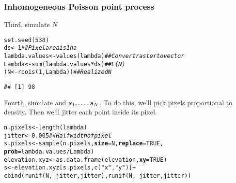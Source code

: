 \documentclass[color=usenames,dvipsnames]{beamer}\usepackage[]{graphicx}\usepackage[]{color}
\makeatletter
\newcommand{\hlnum}[1]{\textcolor[rgb]{0.69,0.494,0}{#1}}%
\newcommand{\hlstr}[1]{\textcolor[rgb]{0.749,0.012,0.012}{#1}}%
\newcommand{\hlcom}[1]{\textcolor[rgb]{0.514,0.506,0.514}{\textit{#1}}}%
\newcommand{\hlopt}[1]{\textcolor[rgb]{0,0,0}{#1}}%
\newcommand{\hlstd}[1]{\textcolor[rgb]{0,0,0}{#1}}%
\newcommand{\hlkwb}[1]{\textcolor[rgb]{0,0.341,0.682}{#1}}%
\newcommand{\hlkwc}[1]{\textcolor[rgb]{0,0,0}{\textbf{#1}}}%
\newcommand{\hlkwd}[1]{\textcolor[rgb]{0.004,0.004,0.506}{#1}}%
\newenvironment{kframe}{%
 \def\at@end@of@kframe{}%
 \ifinner\ifhmode%
  \def\at@end@of@kframe{\end{minipage}}%
  \begin{minipage}{\columnwidth}%
 \fi\fi%
 \def\FrameCommand##1{\hskip\@totalleftmargin \hskip-\fboxsep
 \colorbox{shadecolor}{##1}\hskip-\fboxsep
     \hskip-\linewidth \hskip-\@totalleftmargin \hskip\columnwidth}%
 \MakeFramed {\advance\hsize-\width
   \@totalleftmargin\z@ \linewidth\hsize
   \@setminipage}}%
 {\par\unskip\endMakeFramed%
 \at@end@of@kframe}
\newenvironment{knitrout}{}{} %
\makeatother
\begin{document}
\begin{frame}[fragile]
  \frametitle{Inhomogeneous Poisson point process}
  \small
  Third, simulate $N$
  \vspace{-6pt}
\begin{knitrout}\footnotesize
{}\color{fgcolor}\begin{kframe}
\begin{alltt}
\hlkwd{set.seed}\hlstd{(}\hlnum{538}\hlstd{)}
\hlstd{ds} \hlkwb{<-} \hlnum{1}                            \hlcom{## Pixel area is 1 ha}
\hlstd{lambda.values} \hlkwb{<-} \hlkwd{values}\hlstd{(lambda)}    \hlcom{## Convert raster to vector}
\hlstd{Lambda} \hlkwb{<-} \hlkwd{sum}\hlstd{(lambda.values}\hlopt{*}\hlstd{ds)}    \hlcom{## E(N)}
\hlstd{(N} \hlkwb{<-} \hlkwd{rpois}\hlstd{(}\hlnum{1}\hlstd{, Lambda))}            \hlcom{## Realized N}
\end{alltt}
\begin{verbatim}
## [1] 98
\end{verbatim}
\end{kframe}
\end{knitrout}
\pause
\vfill
Fourth, simulate and ${\bm s}_1, \dots, {\bm s}_N$. To do this, we'll pick
pixels proportional to density. Then we'll jitter each point
inside its pixel. 
  \vspace{-6pt}
\begin{knitrout}\footnotesize
{}\color{fgcolor}\begin{kframe}
\begin{alltt}
\hlstd{n.pixels} \hlkwb{<-} \hlkwd{length}\hlstd{(lambda)}
\hlstd{jitter} \hlkwb{<-} \hlnum{0.005}                    \hlcom{## Half width of pixel }
\hlstd{s.pixels} \hlkwb{<-} \hlkwd{sample}\hlstd{(n.pixels,} \hlkwc{size}\hlstd{=N,} \hlkwc{replace}\hlstd{=}\hlnum{TRUE}\hlstd{,}
                   \hlkwc{prob}\hlstd{=lambda.values}\hlopt{/}\hlstd{Lambda)}
\hlstd{elevation.xyz} \hlkwb{<-} \hlkwd{as.data.frame}\hlstd{(elevation,} \hlkwc{xy}\hlstd{=}\hlnum{TRUE}\hlstd{)}
\hlstd{s} \hlkwb{<-} \hlstd{elevation.xyz[s.pixels,}\hlkwd{c}\hlstd{(}\hlstr{"x"}\hlstd{,}\hlstr{"y"}\hlstd{)]} \hlopt{+}
    \hlkwd{cbind}\hlstd{(}\hlkwd{runif}\hlstd{(N,} \hlopt{-}\hlstd{jitter, jitter),}\hlkwd{runif}\hlstd{(N,} \hlopt{-}\hlstd{jitter, jitter))}
\end{alltt}
\end{kframe}
\end{knitrout}
\end{frame}
\end{document}
